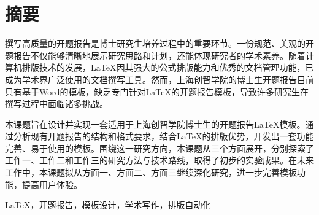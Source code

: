 \chapter*{摘要}

撰写高质量的开题报告是博士研究生培养过程中的重要环节。一份规范、美观的开题报告不仅能够清晰地展示研究思路和计划，还能体现研究者的学术素养。随着计算机排版技术的发展，\LaTeX 因其强大的公式排版能力和优秀的文档管理功能，已成为学术界广泛使用的文档撰写工具。然而，上海创智学院的博士生开题报告目前只有基于Word的模板，缺乏专门针对\LaTeX 的开题报告模板，导致许多研究生在撰写过程中面临诸多挑战。

本课题旨在设计并实现一套适用于上海创智学院博士生的开题报告\LaTeX 模板。通过分析现有开题报告的结构和格式要求，结合\LaTeX 的排版优势，开发出一套功能完善、易于使用的模板。围绕这一研究方向，本课题从三个方面展开，分别探索了工作一、工作二和工作三的研究方法与技术路线，取得了初步的实验成果。在未来工作中，本课题拟从方面一、方面二、方面三继续深化研究，进一步完善模板功能，提高用户体验。

\vspace{3em}
\LaTeX，开题报告，模板设计，学术写作，排版自动化

\clearpage